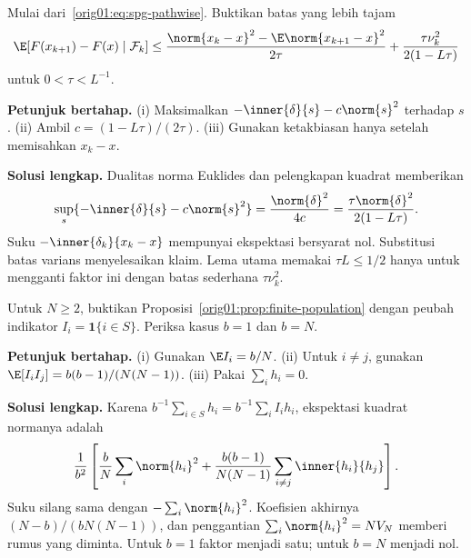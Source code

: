 \begin{exercise}
  \label{orig01:exercise:young-constant}
  Mulai dari~\eqref{orig01:eq:spg-pathwise}. Buktikan batas yang lebih tajam
  \begin{equation}
    \E[F(x_{k+1})-F(x)\mid\mathcal F_k]
    \leq\frac{\norm{x_k-x}^2-
      \E\norm{x_{k+1}-x}^2}{2\tau}
    +\frac{\tau\nu_k^2}{2(1-L\tau)}
  \end{equation}
  untuk $0<\tau<L^{-1}$.

  \textbf{Petunjuk bertahap.}
  (i) Maksimalkan $-\inner{\delta}{s}-c\norm{s}^2$ terhadap $s$.
  (ii) Ambil $c=(1-L\tau)/(2\tau)$.
  (iii) Gunakan ketakbiasan hanya setelah memisahkan $x_k-x$.

  \textbf{Solusi lengkap.}
  Dualitas norma Euklides dan pelengkapan kuadrat memberikan
  \begin{equation}
    \sup_s\{-\inner{\delta}{s}-c\norm{s}^2\}
    =\frac{\norm{\delta}^2}{4c}
    =\frac{\tau\norm{\delta}^2}{2(1-L\tau)}.
  \end{equation}
  Suku $-\inner{\delta_k}{x_k-x}$ mempunyai ekspektasi bersyarat nol.
  Substitusi batas varians menyelesaikan klaim. Lema utama memakai
  $\tau L\leq1/2$ hanya untuk mengganti faktor ini dengan batas sederhana
  $\tau\nu_k^2$.
\end{exercise}

\begin{exercise}
  \label{orig01:exercise:finite-population}
  Untuk $N\geq2$, buktikan Proposisi~\ref{orig01:prop:finite-population} dengan peubah
  indikator $I_i=\mathbf1\{i\in S\}$. Periksa kasus $b=1$ dan $b=N$.

  \textbf{Petunjuk bertahap.}
  (i) Gunakan $\E I_i=b/N$.
  (ii) Untuk $i\ne j$, gunakan
  $\E[I_iI_j]=b(b-1)/(N(N-1))$.
  (iii) Pakai $\sum_i h_i=0$.

  \textbf{Solusi lengkap.}
  Karena $b^{-1}\sum_{i\in S}h_i=b^{-1}\sum_iI_ih_i$,
  ekspektasi kuadrat normanya adalah
  \begin{multline}
    \frac1{b^2}\left[
      \frac bN\sum_i\norm{h_i}^2
      +\frac{b(b-1)}{N(N-1)}
        \sum_{i\ne j}\inner{h_i}{h_j}
    \right].
  \end{multline}
  Suku silang sama dengan $-\sum_i\norm{h_i}^2$. Koefisien akhirnya
  $(N-b)/(bN(N-1))$, dan penggantian
  $\sum_i\norm{h_i}^2=NV_N$ memberi rumus yang diminta. Untuk $b=1$ faktor
  menjadi satu; untuk $b=N$ menjadi nol.
\end{exercise}

